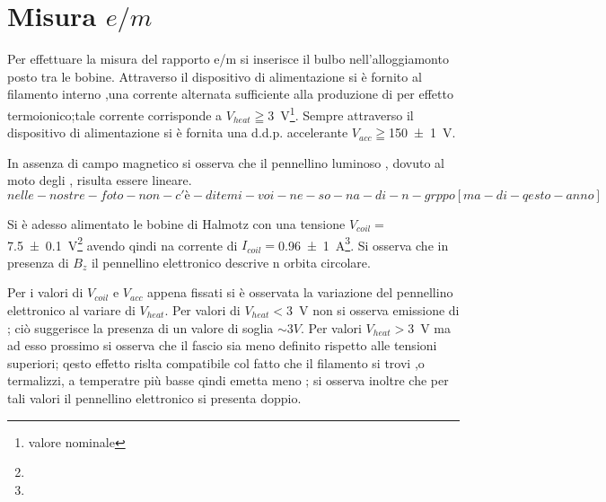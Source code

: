 \section{Misura $e/m$}
	Per effettuare  la misura del rapporto e/m
	si inserisce il bulbo nell'alloggiamonto posto tra le bobine.
	Attraverso il dispositivo di alimentazione si è fornito 
	al filamento interno ,una corrente alternata sufficiente alla produzione di \e 
	per effetto termoionico;tale corrente corrisponde a
	$V_{heat}\geqq$\SI{3 }{\volt}\footnote{valore nominale}.
	Sempre attraverso il dispositivo di alimentazione si è fornita una 
	d.d.p. accelerante $V_{acc}\geqq$\SI{150 \pm 1}{\volt}.
	
	In assenza di campo magnetico si osserva che il pennellino luminoso ,
	dovuto al moto degli \e, risulta essere lineare.
	\bigskip
	$$nelle- nostre- foto- non- c'è -ditemi- voi -ne- so- na- di- n- grppo [ma-di-qesto-anno]$$
	\bigskip
	
	Si è adesso alimentato le bobine di Halmotz con una tensione $V_{coil}=$\SI{7.5 \pm 0.1}{\volt}\footnote[1]{}  
	avendo qindi na corrente di $I_{coil}=$\SI{0.96 \pm 1}{\ampere}\footnote[1]{}.
	Si osserva che in presenza di $B_z$ il pennellino elettronico descrive n orbita 
	circolare.
	
	Per i valori di $V_{coil}$ e $V_{acc}$ appena fissati si è  osservata la variazione del pennellino elettronico al variare di 	$V_{heat}$.
	Per valori di $V_{heat}<$\SI{3}{\volt}
	non si osserva emissione di \e; ciò suggerisce la presenza di un valore di soglia
	$\sim 3 V$. Per valori $V_{heat}>$\SI{3}{\volt} ma ad esso prossimo
	si osserva che il fascio sia meno definito rispetto alle tensioni superiori;
	qesto effetto rislta compatibile col fatto che il filamento si trovi ,o termalizzi, a temperatre più basse qindi emetta meno \e;
	si osserva inoltre che per tali valori il pennellino elettronico si presenta 
	doppio.
	
